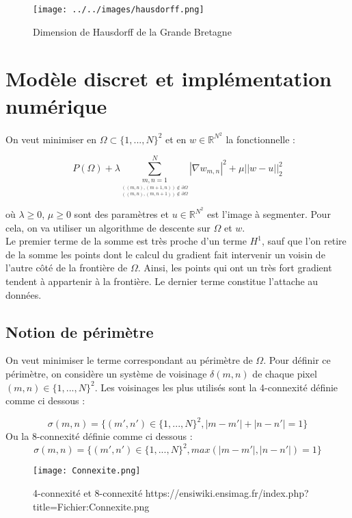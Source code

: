 \begin{figure}[H]
\centering
\texttt{[image: ../../images/hausdorff.png]}
\caption{Dimension de Hausdorff de la Grande Bretagne }
\end{figure}



\section{Modèle discret et implémentation numérique}

On veut minimiser en $\Omega \subset \{1,...,N\}^2$ et en $w \in \mathbb{R}^{N^2}$ la fonctionnelle : 

\[ P(\Omega) + \lambda \sum \limits_{\underset{((m,n), (m, n+1)) \notin \partial \Omega}{\underset{((m,n),(m+1, n)) \notin \partial \Omega}{m,n = 1}}}^{N} |\nabla w_{m,n}|^2 + \mu ||w - u ||_2^2 \]

où $\lambda \geq 0$, $\mu \geq 0$ sont des paramètres et $u \in \mathbb{R}^{N^2}$ est l'image à segmenter. Pour cela, on va utiliser un algorithme de descente sur $\Omega$ et $w$. \\

Le premier terme de la somme est très proche d'un terme $H^1$, sauf que l'on retire de la somme les points dont le calcul du gradient fait intervenir un voisin de l'autre côté de la frontière de $\Omega$. Ainsi, les points qui ont un très fort gradient tendent à appartenir à la frontière. Le dernier terme constitue l'attache au données. 
\subsection{Notion de périmètre}
On veut minimiser le terme correspondant au périmètre de $\Omega$. Pour définir ce périmètre, on considère un système de voisinage $\delta(m,n)$ de chaque pixel $(m,n) \in \{1,...,N\}^2$. Les voisinages les plus utilisés sont la 4-connexité définie comme ci dessous :

\[ \sigma (m,n) = \{ (m',n') \in  \{1,...,N\}^2, |m - m' | + |n - n'| = 1 \}\]
Ou la 8-connexité définie comme ci dessous : 
\[ \sigma (m,n) = \{ (m',n') \in  \{1,...,N\}^2, max(|m - m' | , |n - n'| ) = 1 \}\]

\begin{figure}[H]
\centering
\texttt{[image: Connexite.png]}
\caption{4-connexité et 8-connexité \newline  https://ensiwiki.ensimag.fr/index.php?title=Fichier:Connexite.png}
\end{figure}

